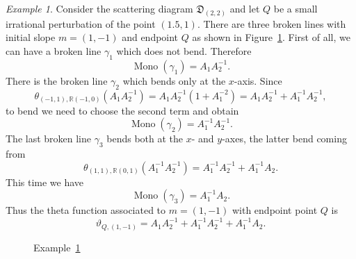 \documentclass[11pt]{amsart}
\theoremstyle{remark}
\newtheorem{example}[theorem]{Example}
\numberwithin{equation}{section}
\newcommand{\RR}{\mathbb{R}}
\newcommand{\fD}{\mathfrak{D}}
\newcommand{\Mono}{\operatorname{Mono}}
\begin{document}
\begin{example} 
  \label{brokenex}
  Consider the scattering diagram $\fD_{(2,2)}$ and let $Q$ be a small
  irrational perturbation of the point $(1.5,1)$. There are three broken lines
  with initial slope $m = (1,-1)$ and endpoint $Q$ as shown in
  Figure~\ref{figbrokenex}.
  First of all, we can have a broken line $\gamma_1$ which does not bend.
  Therefore
  \[
    \Mono(\gamma_1) = A_1 A_2^{-1}.
  \]
  There is the broken line $\gamma_2$  which bends only at the $x$-axis. Since
  \[ 
    \theta_{(-1,1), \RR(-1,0)} (A_1 A_2^{-1}) = 
    A_1 A_2^{-1}(1+A_1^{-2}) =  A_1 A_2^{-1} + A_1^{-1} A_2^{-1},
  \]
  to bend we need to choose the second term and obtain 
  \[
    \Mono(\gamma_2) =  A_1^{-1} A_2^{-1}.
  \]
  The last broken line $\gamma_3$ bends both at the $x$- and $y$-axes, the
  latter bend coming from
  \[ 
    \theta_{ (1,1), \RR (0,1)} ( A_1^{-1} A_2^{-1}) =  
    A_1^{-1} A_2^{-1} + A_1^{-1} A_2.  
  \]
  This time we have 
  \[
    \Mono (\gamma_3) = A_1^{-1} A_2.
  \]
  Thus the theta function associated to $m = (1,-1)$ with endpoint point $Q$ is 
  \[ 
    \vartheta_{Q, (1,-1)} =  
    A_1 A_2^{-1} + A_1^{-1} A_2^{-1} +A_1^{-1} A_2 .  
  \]
\end{example}

\begin{figure}
  \centering
  \caption{Example~\ref{brokenex}} 
  \label{figbrokenex}
\end{figure}
\end{document}
